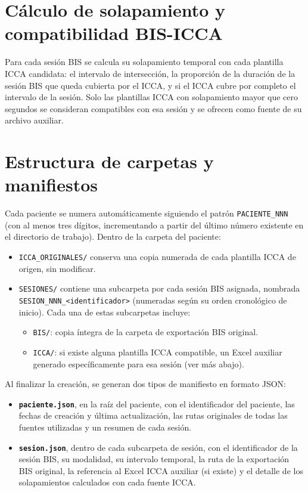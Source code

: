 \documentclass[
  spanish,
  a4paper,
  12pt,
  twoside]{memoir}
\providecommand{\tightlist}{%
  \setlength{\itemsep}{0pt}\setlength{\parskip}{0pt}}
\begin{document}
\section{Cálculo de solapamiento y compatibilidad
BIS-ICCA}\label{cuxe1lculo-de-solapamiento-y-compatibilidad-bis-icca}

Para cada sesión BIS se calcula su solapamiento temporal con cada
plantilla ICCA candidata: el intervalo de intersección, la proporción de
la duración de la sesión BIS que queda cubierta por el ICCA, y si el
ICCA cubre por completo el intervalo de la sesión. Solo las plantillas
ICCA con solapamiento mayor que cero segundos se consideran compatibles
con esa sesión y se ofrecen como fuente de su archivo auxiliar.

\section{Estructura de carpetas y
manifiestos}\label{estructura-de-carpetas-y-manifiestos}

Cada paciente se numera automáticamente siguiendo el patrón
\texttt{PACIENTE\_NNN} (con al menos tres dígitos, incrementando a
partir del último número existente en el directorio de trabajo). Dentro
de la carpeta del paciente:

\begin{itemize}
\tightlist
\item
  \texttt{ICCA\_ORIGINALES/} conserva una copia numerada de cada
  plantilla ICCA de origen, sin modificar.
\item
  \texttt{SESIONES/} contiene una subcarpeta por cada sesión BIS
  asignada, nombrada
  \texttt{SESION\_NNN\_\textless{}identificador\textgreater{}}
  (numeradas según su orden cronológico de inicio). Cada una de estas
  subcarpetas incluye:

  \begin{itemize}
  \tightlist
  \item
    \texttt{BIS/}: copia íntegra de la carpeta de exportación BIS
    original.
  \item
    \texttt{ICCA/}: si existe alguna plantilla ICCA compatible, un Excel
    auxiliar generado específicamente para esa sesión (ver más abajo).
  \end{itemize}
\end{itemize}

Al finalizar la creación, se generan dos tipos de manifiesto en formato
JSON:

\begin{itemize}
\tightlist
\item
  \textbf{\texttt{paciente.json}}, en la raíz del paciente, con el
  identificador del paciente, las fechas de creación y última
  actualización, las rutas originales de todas las fuentes utilizadas y
  un resumen de cada sesión.
\item
  \textbf{\texttt{sesion.json}}, dentro de cada subcarpeta de sesión,
  con el identificador de la sesión BIS, su modalidad, su intervalo
  temporal, la ruta de la exportación BIS original, la referencia al
  Excel ICCA auxiliar (si existe) y el detalle de los solapamientos
  calculados con cada fuente ICCA.
\end{itemize}
\end{document}
